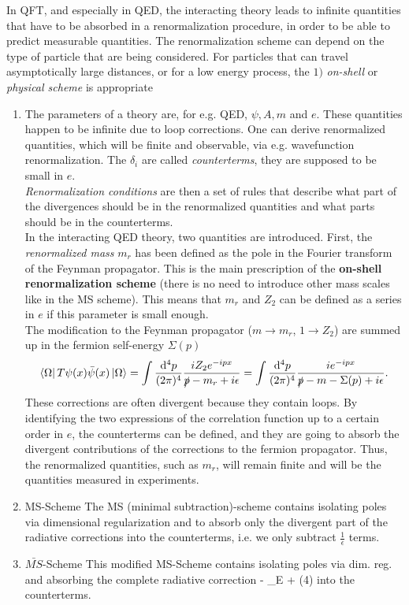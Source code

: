 In QFT, and especially in QED, the interacting theory leads to infinite quantities that have to be absorbed in a renormalization procedure, in order to be able to predict measurable quantities. The renormalization scheme can depend on the type of particle that are being considered. For particles that can travel asymptotically large distances, or for a low energy process, the $1)$ \emph{on-shell} or \emph{physical scheme} is appropriate
\begin{enumerate}
	\item The parameters of a theory are, for e.g. QED, $\psi, A, m$ and $e$. These quantities happen to be infinite due to loop corrections. One can derive renormalized quantities, which will be finite and observable, via e.g. wavefunction renormalization. The $\delta_i$ are called \emph{counterterms}, they are supposed to be small in $e$.\\
	\emph{Renormalization conditions} are then a set of rules that describe what part of the divergences should be in the renormalized quantities and what parts should be in the counterterms.\\
	In the interacting QED theory, two quantities are introduced. First, the \emph{renormalized mass} $m_r$ has been defined as the pole in the Fourier transform of the Feynman propagator. This is the main prescription of the \textbf{on-shell renormalization scheme} (there is no need to introduce other mass scales like in the MS scheme). This means that $m_r$ and $Z_2$ can be defined as a series in $e$ if this parameter is small enough.\\
	The modification to the Feynman propagator ($m\rightarrow m_r$, $1\rightarrow Z_2$) are summed up in the fermion self-energy $\Sigma(p)$
	\begin{equation}
		\bra{\Omega}T\psi(x) \bar{\psi}(x)\ket{\Omega} = \int \frac{\mathrm{d}^4 p}{(2 \pi)^4} \frac{iZ_2 e^{-ipx}}{\slashed{p} -m_r+i\epsilon} = \int \frac{\mathrm{d}^4 p}{(2 \pi)^4} \frac{i e^{-i p x}}{\slashed{p} - m-\Sigma(p) +i\epsilon}.
	\end{equation}
	These corrections are often divergent because they contain loops. By identifying the two expressions of the correlation function up to a certain order in $e$, the counterterms can be defined, and they are going to absorb the divergent contributions of the corrections to the fermion propagator. Thus, the renormalized quantities, such as $m_r$, will remain finite and will be the quantities measured in experiments.
	\item \begin{mybox}{MS-Scheme}
	The MS (minimal subtraction)-scheme contains isolating poles via dimensional regularization and to absorb only the divergent part of the radiative corrections into the counterterms, i.e. we only subtract $\frac{1}{\epsilon}$ terms.
	\end{mybox}
\item \begin{mybox}{$\bar{MS}$-Scheme}
	This modified MS-Scheme contains isolating poles via dim. reg. and absorbing the complete radiative correction 
	\bse 
	 - \gamma_{E} + \ln(4\pi) 
	\ese 
	into the counterterms.
\end{mybox}
\end{enumerate}



